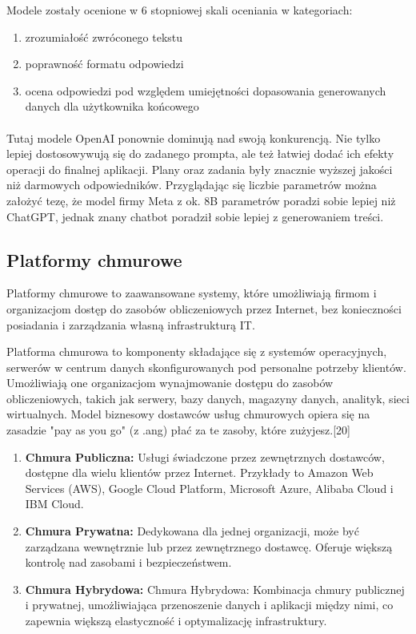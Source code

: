 \noindent Modele zostały ocenione w 6 stopniowej skali oceniania w kategoriach:
\begin{enumerate}
    \item zrozumiałość zwróconego tekstu
    \item poprawność formatu odpowiedzi
    \item ocena odpowiedzi pod względem umiejętności dopasowania generowanych danych dla użytkownika końcowego
\end{enumerate}

\paragraph{} Tutaj modele OpenAI ponownie dominują nad swoją konkurencją. Nie tylko lepiej dostosowywują się do zadanego prompta, ale też łatwiej dodać ich efekty operacji do finalnej aplikacji.
Plany oraz zadania były znacznie wyższej jakości niż darmowych odpowiedników. Przyglądając się liczbie parametrów można założyć tezę, że model firmy Meta z  ok. 8B parametrów poradzi sobie lepiej niż ChatGPT, jednak znany chatbot poradził sobie lepiej z generowaniem treści.

\clearpage

\subsection{Platformy chmurowe}
Platformy chmurowe to zaawansowane systemy, które umożliwiają firmom i organizacjom dostęp do zasobów obliczeniowych przez Internet, bez konieczności posiadania i zarządzania własną infrastrukturą IT.

Platforma chmurowa to komponenty składające się z systemów operacyjnych, serwerów w centrum danych skonfigurowanych pod personalne potrzeby klientów. Umożliwiają one organizacjom wynajmowanie dostępu do zasobów obliczeniowych, takich jak serwery, bazy danych, magazyny danych, analityk, sieci wirtualnych. Model biznesowy dostawców usług chmurowych opiera się na zasadzie "pay as you go" (z .ang) płać za te zasoby, które zużyjesz.[20]
\\


\begin{enumerate}
    \item {\bf Chmura Publiczna:} Usługi świadczone przez zewnętrznych dostawców, dostępne dla wielu klientów przez Internet. Przykłady to Amazon Web Services (AWS), Google Cloud Platform, Microsoft Azure, Alibaba Cloud i IBM Cloud.
    \item {\bf  Chmura Prywatna:} Dedykowana dla jednej organizacji, może być zarządzana wewnętrznie lub przez zewnętrznego dostawcę. Oferuje większą kontrolę nad zasobami i bezpieczeństwem.
    \item {\bf Chmura Hybrydowa:} Chmura Hybrydowa: Kombinacja chmury publicznej i prywatnej, umożliwiająca przenoszenie danych i aplikacji między nimi, co zapewnia większą elastyczność i optymalizację infrastruktury.
\end{enumerate} 

